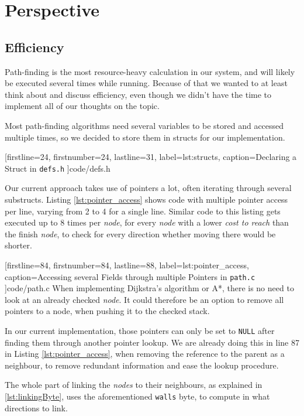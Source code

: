 \chapter{Perspective}
\section{Efficiency}
Path-finding is the most resource-heavy calculation in our system,
and will likely be executed several times while running.
Because of that we wanted to at least think about and discuss efficiency,
even though we didn't have the time to implement all of our thoughts on the topic.

Most path-finding algorithms need several variables to be stored and accessed multiple times,
so we decided to store them in structs for our implementation.


[firstline=24,				%
firstnumber=24,
lastline=31,
label=lst:structs,	%
caption={Declaring a Struct  in {\tt defs.h}}
]{code/defs.h}
%



Our current approach takes use of pointers a lot,
often iterating through several substructs.
Listing \ref{lst:pointer_access} shows code with multiple pointer access per line,
varying from 2 to 4 for a single line.
Similar code to this listing gets executed up to 8 times per \emph{node},
for every \emph{node} with a lower \emph{cost to reach} than the finish \emph{node},
to check for every direction whether moving there would be shorter.


[firstline=84,				%
firstnumber=84,
lastline=88,
label=lst:pointer_access,	%
caption={Accessing several Fields through multiple Pointers in {\tt path.c}}
]{code/path.c}
%
When implementing Dijkstra's algorithm or A*,
there is no need to look at an already checked \emph{node}.
It could therefore be an option to remove all pointers to a node,
when pushing it to the checked stack.

In our current implementation,
those pointers can only be set to {\tt NULL} after finding them through another pointer lookup.
We are already doing this in line 87 in Listing \ref{lst:pointer_access},
when removing the reference to the parent as a neighbour,
to remove redundant information and ease the lookup procedure.

The whole part of linking the \emph{nodes} to their neighbours,
as explained in \ref{lst:linkingByte},
uses the aforementioned {\tt walls} byte,
to compute in what directions to link.


